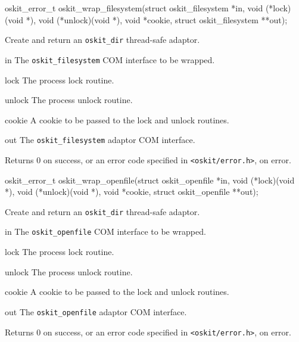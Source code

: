 \begin{apisyn}

	\funcproto oskit_error_t
	oskit_wrap_filesystem(struct oskit_filesystem *in, 
		void (*lock)(void *), 
		void (*unlock)(void *),
		void *cookie,
		struct oskit_filesystem **out);
\end{apisyn}
\begin{apidesc}
	Create and return an {\tt oskit_dir} thread-safe adaptor.
\end{apidesc}
\begin{apiparm}
	\item[in]
		The {\tt oskit_filesystem} COM interface to be wrapped.
	\item[lock]
		The process lock routine.
	\item[unlock]
		The process unlock routine.
	\item[cookie]
		A cookie to be passed to the lock and unlock routines.
	\item[out]
		The {\tt oskit_filesystem} adaptor COM interface.
\end{apiparm}
\begin{apiret}
	Returns 0 on success, or an error code specified in
	{\tt <oskit/error.h>}, on error.
\end{apiret}


\begin{apisyn}

	\funcproto oskit_error_t
	oskit_wrap_openfile(struct oskit_openfile *in, 
		void (*lock)(void *), 
		void (*unlock)(void *),
		void *cookie,
		struct oskit_openfile **out);
\end{apisyn}
\begin{apidesc}
	Create and return an {\tt oskit_dir} thread-safe adaptor.
\end{apidesc}
\begin{apiparm}
	\item[in]
		The {\tt oskit_openfile} COM interface to be wrapped.
	\item[lock]
		The process lock routine.
	\item[unlock]
		The process unlock routine.
	\item[cookie]
		A cookie to be passed to the lock and unlock routines.
	\item[out]
		The {\tt oskit_openfile} adaptor COM interface.
\end{apiparm}
\begin{apiret}
	Returns 0 on success, or an error code specified in
	{\tt <oskit/error.h>}, on error.
\end{apiret}


